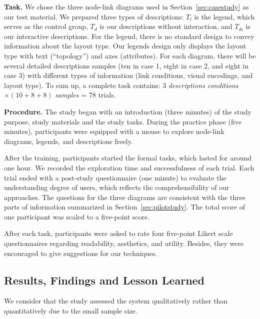 \textbf{Task. }
We chose the three node-link diagrams used in Section~\ref{sec:casestudy} as our test material. We prepared three types of descriptions: $T_l$ is the legend, which serves as the control group, $T_d$ is our descriptions without interaction, and $T_{di}$ is our interactive descriptions. For the legend, there is no standard design to convey information about the layout type. Our legends design only displays the layout type with text (``topology'') and axes (attributes). For each diagram, there will be 
several detailed descriptions samples (ten in case 1, eight in case 2, and eight in case 3) with different types of information (link conditions, visual encodings, and layout type).  To sum up, a complete task contains: 3 \emph{descriptions conditions} $\times (10+8+8)$ \emph{samples} = 78 trials. 

\textbf{Procedure. }
The study began with an introduction (three minutes) of the study purpose, study materials and the study tasks. During the practice phase (five minutes), participants were equipped with a mouse to explore node-link diagrams, legends, and descriptions freely.

After the training, participants started the formal tasks, which lasted for around one hour. We recorded the exploration time and successfulness of each trial. Each trial ended with a post-study questionnaire (one minute) to evaluate the understanding degree of users, which reflects the comprehensibility of our approaches. The questions for the three diagrams are consistent with the three parts of information summarized in Section~\ref{sec:pilotstudy}. 
The total score of one participant was scaled to a five-point score.

After each task, participants were asked to rate four five-point Likert scale questionnaires regarding readability, aesthetics, and utility. Besides, they were encouraged to give suggestions for our techniques.

\subsection{Results, Findings and Lesson Learned}
We consider that the study assessed the system qualitatively rather than quantitatively due to the small sample size. 


